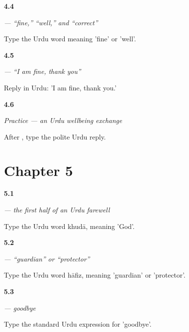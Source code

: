 \noindent\begin{minipage}[t]{\linewidth}
\raggedright
\hypertarget{review-UR-C04-thik-well}{\textbf{4.4}} \emph{ — “fine,” “well,” and “correct”}\par
\small Type the Urdu word meaning 'fine' or 'well'.
\end{minipage}\par\medskip

\noindent\begin{minipage}[t]{\linewidth}
\raggedright
\hypertarget{review-UR-C04-main-thik-hun-reply}{\textbf{4.5}} \emph{    — “I am fine, thank you”}\par
\small Reply in Urdu: 'I am fine, thank you.'
\end{minipage}\par\medskip

\noindent\begin{minipage}[t]{\linewidth}
\raggedright
\hypertarget{review-UR-C04-practice-next-line}{\textbf{4.6}} \emph{Practice — an Urdu wellbeing exchange}\par
\small After   , type the polite Urdu reply.
\end{minipage}\par\medskip

\section*{Chapter 5}

\noindent\begin{minipage}[t]{\linewidth}
\raggedright
\hypertarget{review-UR-C05-khuda-meaning}{\textbf{5.1}} \emph{ — the first half of an Urdu farewell}\par
\small Type the Urdu word khudā, meaning 'God'.
\end{minipage}\par\medskip

\noindent\begin{minipage}[t]{\linewidth}
\raggedright
\hypertarget{review-UR-C05-hafiz-meaning}{\textbf{5.2}} \emph{ — “guardian” or “protector”}\par
\small Type the Urdu word hāfiz, meaning 'guardian' or 'protector'.
\end{minipage}\par\medskip

\noindent\begin{minipage}[t]{\linewidth}
\raggedright
\hypertarget{review-UR-C05-khuda-hafiz-goodbye}{\textbf{5.3}} \emph{  — goodbye}\par
\small Type the standard Urdu expression for 'goodbye'.
\end{minipage}\par\medskip

